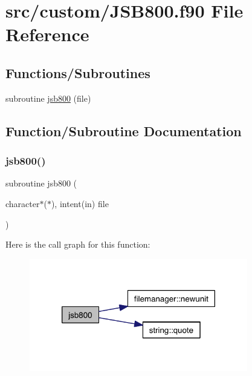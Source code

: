 \hypertarget{_j_s_b800_8f90}{}\section{src/custom/\+J\+S\+B800.f90 File Reference}
\label{_j_s_b800_8f90}
\subsection*{Functions/\+Subroutines}
\begin{DoxyCompactItemize}
\item 
subroutine \hyperlink{_j_s_b800_8f90_a499e9190796ef2b26f2f8626d3568376}{jsb800} (file)
\end{DoxyCompactItemize}


\subsection{Function/\+Subroutine Documentation}
\mbox{\label{_j_s_b800_8f90_a499e9190796ef2b26f2f8626d3568376}} 
\subsubsection{\texorpdfstring{jsb800()}{jsb800()}}
{\footnotesize\ttfamily subroutine jsb800 (\begin{DoxyParamCaption}\item[{character$\ast$($\ast$), intent(in)}]{file }\end{DoxyParamCaption})}

Here is the call graph for this function\+:\nopagebreak
\begin{figure}[H]
\begin{center}
\leavevmode
\includegraphics[width=270pt]{_j_s_b800_8f90_a499e9190796ef2b26f2f8626d3568376_cgraph}
\end{center}
\end{figure}
